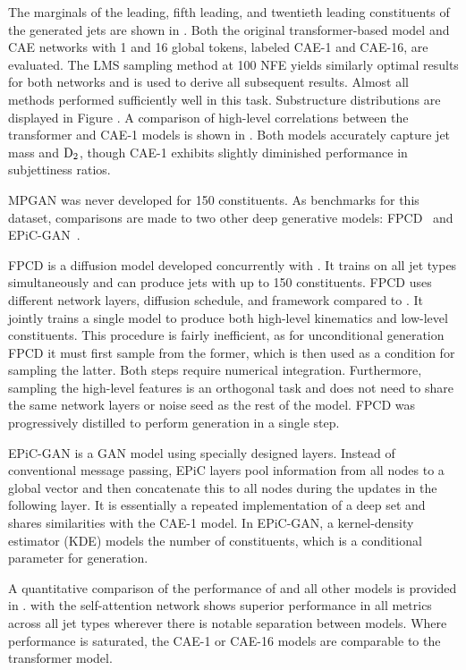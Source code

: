 The marginals of the leading, fifth leading, and twentieth leading constituents of the generated jets are shown in .
Both the original transformer-based model and CAE networks with 1 and 16 global tokens, labeled CAE-1 and CAE-16, are evaluated.
The LMS sampling method at 100 NFE yields similarly optimal results for both networks and is used to derive all subsequent results.
Almost all methods performed sufficiently well in this task.
Substructure distributions are displayed in Figure .
A comparison of high-level correlations between the transformer and CAE-1 models is shown in .
Both models accurately capture jet mass and $\text{D}_2$, though CAE-1 exhibits slightly diminished performance in subjettiness ratios.

MPGAN was never developed for 150 constituents.
As benchmarks for this dataset, comparisons are made to two other deep generative models: FPCD~\cite{FPCD} and EPiC-GAN~\cite{EPICGAN}.

FPCD is a diffusion model developed concurrently with \pcdroid.
It trains on all jet types simultaneously and can produce jets with up to 150 constituents.
FPCD uses different network layers, diffusion schedule, and framework compared to \pcdroid. It jointly trains a single model to produce both high-level kinematics and low-level constituents.
This procedure is fairly inefficient, as for unconditional generation FPCD it must first sample from the former, which is then used as a condition for sampling the latter.
Both steps require numerical integration.
Furthermore, sampling the high-level features is an orthogonal task and does not need to share the same network layers or noise seed as the rest of the model.
FPCD was progressively distilled to perform generation in a single step.

EPiC-GAN is a GAN model using specially designed layers.
Instead of conventional message passing, EPiC layers pool information from all nodes to a global vector and then concatenate this to all nodes during the updates in the following layer.
It is essentially a repeated implementation of a deep set and shares similarities with the CAE-1 model.
In EPiC-GAN, a kernel-density estimator (KDE) models the number of constituents, which is a conditional parameter for generation.

A quantitative comparison of the performance of \pcdroid and all other models is provided in .
\pcdroid with the self-attention network shows superior performance in all metrics across all jet types wherever there is notable separation between models.
Where performance is saturated, the CAE-1 or CAE-16 models are comparable to the transformer model.

